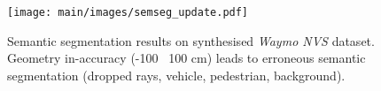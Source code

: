 \begin{figure}[t]
    \centering
        \texttt{[image: main/images/semseg\_update.pdf]}
        \caption{Semantic segmentation results on synthesised \textit{Waymo NVS} dataset. Geometry in-accuracy (-100 \bwr~100 cm) leads to erroneous semantic segmentation ({\setlength{\fboxsep}{0pt}\colorbox{ourgray}{dropped rays}}, {\setlength{\fboxsep}{0pt}\colorbox{sem0}{vehicle}}, {\setlength{\fboxsep}{0pt}\colorbox{sem1}{pedestrian}}, {\setlength{\fboxsep}{0pt}\colorbox{sem2}{background}}).}
    \label{fig:semseg}
\end{figure}